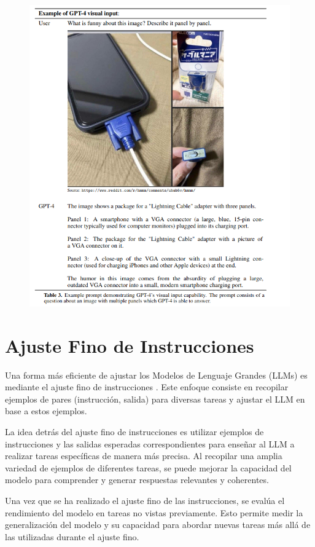 \begin{figure}[h]
	\includegraphics[scale = 0.35]{pics/gpt4.png}
\end{figure}




\section{Ajuste Fino de Instrucciones}
Una forma más eficiente de ajustar los Modelos de Lenguaje Grandes (LLMs) es mediante el ajuste fino de instrucciones \cite{chung2022scaling}. Este enfoque consiste en recopilar ejemplos de pares (instrucción, salida) para diversas tareas y ajustar el LLM en base a estos ejemplos.

La idea detrás del ajuste fino de instrucciones es utilizar ejemplos de instrucciones y las salidas esperadas correspondientes para enseñar al LLM a realizar tareas específicas de manera más precisa. Al recopilar una amplia variedad de ejemplos de diferentes tareas, se puede mejorar la capacidad del modelo para comprender y generar respuestas relevantes y coherentes.

Una vez que se ha realizado el ajuste fino de las instrucciones, se evalúa el rendimiento del modelo en tareas no vistas previamente. Esto permite medir la generalización del modelo y su capacidad para abordar nuevas tareas más allá de las utilizadas durante el ajuste fino.

